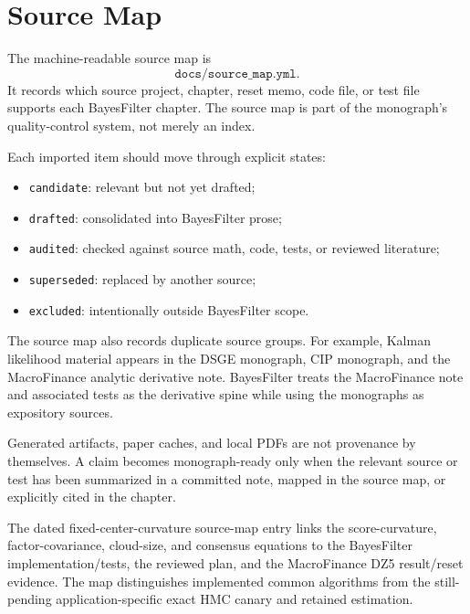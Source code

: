 \chapter{Source Map}
\label{app:bf-source-map}

The machine-readable source map is
\[
  \texttt{docs/source\_map.yml}.
\]
It records which source project, chapter, reset memo, code file, or test file
supports each BayesFilter chapter.  The source map is part of the monograph's
quality-control system, not merely an index.

Each imported item should move through explicit states:
\begin{itemize}
  \item \texttt{candidate}: relevant but not yet drafted;
  \item \texttt{drafted}: consolidated into BayesFilter prose;
  \item \texttt{audited}: checked against source math, code, tests, or reviewed
    literature;
  \item \texttt{superseded}: replaced by another source;
  \item \texttt{excluded}: intentionally outside BayesFilter scope.
\end{itemize}

The source map also records duplicate source groups.  For example, Kalman
likelihood material appears in the DSGE monograph, CIP monograph, and the
MacroFinance analytic derivative note.  BayesFilter treats the MacroFinance
note and associated tests as the derivative spine while using the monographs as
expository sources.

Generated artifacts, paper caches, and local PDFs are not provenance by
themselves.  A claim becomes monograph-ready only when the relevant source or
test has been summarized in a committed note, mapped in the source map, or
explicitly cited in the chapter.

The dated fixed-center-curvature source-map entry links the score-curvature,
factor-covariance, cloud-size, and consensus equations to the BayesFilter
implementation/tests, the reviewed plan, and the MacroFinance DZ5 result/reset
evidence.  The map distinguishes implemented common algorithms from the
still-pending application-specific exact HMC canary and retained estimation.
